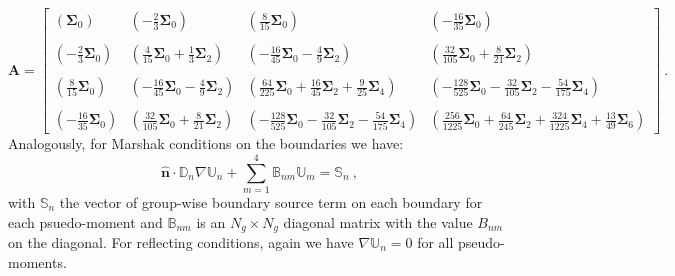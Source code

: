 \documentclass[letterpaper,12pt]{article}
\begin{document}
\begin{equation}
  \mathbf{A} = 
  \begin{bmatrix}
    (\mathbf{\Sigma}_0) &
    (-\frac{2}{3}\mathbf{\Sigma}_0) &
    (\frac{8}{15}\mathbf{\Sigma}_0) &
    (-\frac{16}{35}\mathbf{\Sigma}_0) \\
    &&&\\
    (-\frac{2}{3}\mathbf{\Sigma}_0) &
    (\frac{4}{15}\mathbf{\Sigma}_0 + \frac{1}{3}\mathbf{\Sigma}_2) &
    (-\frac{16}{45}\mathbf{\Sigma}_0 - \frac{4}{9}\mathbf{\Sigma}_2) &
    (\frac{32}{105}\mathbf{\Sigma}_0 + \frac{8}{21}\mathbf{\Sigma}_2) \\
    &&&\\
    (\frac{8}{15}\mathbf{\Sigma}_0) &
    (-\frac{16}{45}\mathbf{\Sigma}_0 - \frac{4}{9}\mathbf{\Sigma}_2) &
    (\frac{64}{225}\mathbf{\Sigma}_0 + \frac{16}{45}\mathbf{\Sigma}_2 + \frac{9}{25}\mathbf{\Sigma}_4) &
    (-\frac{128}{525}\mathbf{\Sigma}_0 - \frac{32}{105}\mathbf{\Sigma}_2 - \frac{54}{175}\mathbf{\Sigma}_4)
    \\ 
    &&&\\
    (-\frac{16}{35}\mathbf{\Sigma}_0) &
    (\frac{32}{105}\mathbf{\Sigma}_0 + \frac{8}{21}\mathbf{\Sigma}_2) &
    (-\frac{128}{525}\mathbf{\Sigma}_0 - \frac{32}{105}\mathbf{\Sigma}_2 - \frac{54}{175}\mathbf{\Sigma}_4)
    & 
    (\frac{256}{1225}\mathbf{\Sigma}_0 + \frac{64}{245}\mathbf{\Sigma}_2 +
    \frac{324}{1225}\mathbf{\Sigma}_4 + \frac{13}{49}\mathbf{\Sigma}_6)
  \end{bmatrix}\:.
  \label{eq:A_block_matrix}
\end{equation}
Analogously, for Marshak conditions on the boundaries we have:
\begin{equation}
  \hat{\mathbf{n}} \cdot \mathbb{D}_n \nabla \mathbb{U}_n +
  \sum_{m=1}^4 \mathbb{B}_{nm} \mathbb{U}_m = \mathbb{S}_n\:,
  \label{eq:spn_multigroup_bnd}
\end{equation}
with $\mathbb{S}_n$ the vector of group-wise boundary source term on
each boundary for each psuedo-moment and $\mathbb{B}_{nm}$ is an $N_g
\times N_g$ diagonal matrix with the value $B_{nm}$ on the
diagonal. For reflecting conditions, again we have $\nabla
\mathbb{U}_n = 0$ for all pseudo-moments.
\end{document}

